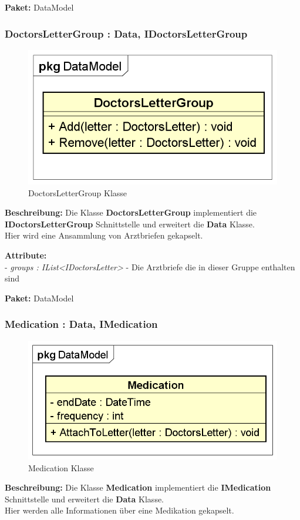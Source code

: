 \documentclass[a4paper]{scrreprt}
\begin{document}
\textbf{Paket:} DataModel

\subsubsection{DoctorsLetterGroup : Data, IDoctorsLetterGroup}
\begin{figure}[H]
\centering
\includegraphics[width=0.45\textheight]{graphics/Klassendiagramme/Model/DoctorsLetterGroup.png}
\caption{DoctorsLetterGroup Klasse}
\end{figure}
\textbf{Beschreibung:} Die Klasse \textbf{DoctorsLetterGroup} implementiert die \textbf{IDoctorsLetterGroup} Schnittstelle und erweitert die \textbf{Data} Klasse.\\
Hier wird eine Ansammlung von Arztbriefen gekapselt.

\textbf{Attribute:}\\
- \textit{groups : IList<IDoctorsLetter>} - Die Arztbriefe die in dieser Gruppe enthalten sind

\textbf{Paket:} DataModel

\subsubsection{Medication : Data, IMedication}
\begin{figure}[H]
\centering
\includegraphics[width=0.45\textheight]{graphics/Klassendiagramme/Model/Medication.png}
\caption{Medication Klasse}
\end{figure}
\textbf{Beschreibung:} Die Klasse \textbf{Medication} implementiert die \textbf{IMedication} Schnittstelle und erweitert die \textbf{Data} Klasse.\\
Hier werden alle Informationen über eine Medikation gekapselt.
\end{document}
